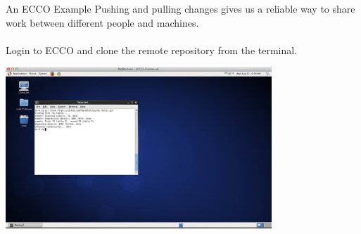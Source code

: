 \documentclass[10pt]{beamer}
\begin{document}
\begin{frame}[plain]{}



\end{frame}


\appendix

\begin{frame}[fragile]{An ECCO Example}
Pushing and pulling changes gives us a reliable way to share work between different people and machines.\\~\\

Login to ECCO and clone the remote repository from the terminal.

\begin{center}
\includegraphics[width=10cm]{./auxfiles/ECCO.jpg}
\end{center}



\end{frame}
\end{document}
